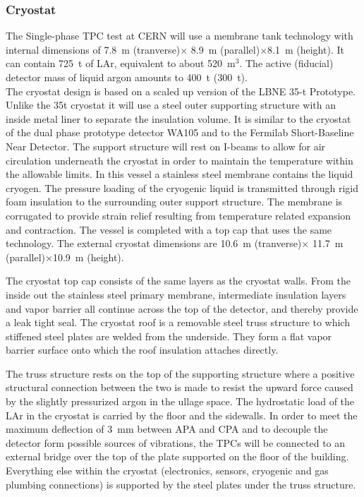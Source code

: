\subsubsection{Cryostat}

The Single-phase TPC test at CERN will use a membrane tank technology
with internal dimensions of 7.8~m (tranverse)$\times$ 8.9~m
(parallel)$\times$8.1~m (height).  It can contain 725~t of LAr,
equivalent to about 520~m$^3$. The active (fiducial) detector mass of
liquid argon amounts to 400~t (300~t).\\ The cryostat design is
based on a scaled up version of the LBNE 35-t
Prototype\cite{bib:membcryo1573}.  Unlike the 35t cryostat it will use
a steel outer supporting structure with an inside metal liner to
separate the insulation volume. It is similar to the cryostat of the
dual phase prototype detector WA105 and to the Fermilab Short-Baseline
Near Detector. The support structure will rest on I-beams to allow for
air circulation underneath the cryostat in order to maintain the
temperature within the allowable limits.  In this vessel a stainless
steel membrane contains the liquid cryogen. The pressure loading of
the cryogenic liquid is transmitted through rigid foam insulation to
the surrounding outer support structure. The membrane is corrugated to
provide strain relief resulting from temperature related expansion and
contraction. The vessel is completed with a top cap that uses the same
technology.  The external cryostat dimensions are 10.6~m
(tranverse)$\times$ 11.7~m (parallel)$\times$10.9~m (height).


The cryostat top cap consists of the same layers as the cryostat
walls. From the inside out the stainless steel primary membrane,
intermediate insulation layers and vapor barrier all continue across
the top of the detector, and thereby provide a leak tight seal.  The
cryostat roof is a removable steel truss structure to which stiffened
steel plates are welded from the underside. They form a flat vapor
barrier surface onto which the roof insulation attaches directly.

The truss structure rests on the top of the supporting structure where
a positive structural connection between the two is made to resist the
upward force caused by the slightly pressurized argon in the ullage
space. The hydrostatic load of the LAr in the cryostat is carried by
the floor and the sidewalls. In order to meet the maximum deflection
of 3~mm between APA and CPA and to decouple the detector form possible
sources of vibrations, the TPCs will be connected to an external
bridge over the top of the plate supported on the floor of the
building. Everything else within the cryostat (electronics, sensors,
cryogenic and gas plumbing connections) is supported by the steel
plates under the truss structure.


